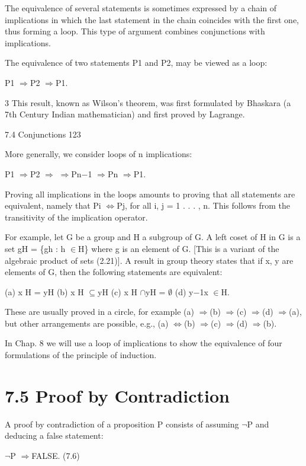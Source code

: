 \documentclass[11pt]{article}
\theoremstyle{plain}
\theoremstyle{definition}
\begin{document}
The equivalence of several statements is sometimes expressed by a chain of implications in which the last statement in the chain coincides with the first one, thus forming a loop. This type of argument combines conjunctions with implications.

The equivalence of two statements P1 and P2, may be viewed as a loop:

P1 $\Rightarrow$P2 $\Rightarrow$P1.

3 This result, known as Wilson's theorem, was first formulated by Bhaskara (a 7th Century Indian mathematician) and first proved by Lagrange.

7.4 Conjunctions 123

More generally, we consider loops of n implications:

P1 $\Rightarrow$P2 $\Rightarrow$\textperiodcentered{} \textperiodcentered{} \textperiodcentered{} $\Rightarrow$Pn$-$1 $\Rightarrow$Pn $\Rightarrow$P1.

Proving all implications in the loops amounts to proving that all statements are equivalent, namely that Pi $\Leftrightarrow$Pj, for all i, j = 1 . . . , n. This follows from the transitivity of the implication operator.

For example, let G be a group and H a subgroup of G. A left coset of H in G is a set gH = \{gh : h $\in$H\} where g is an element of G. [This is a variant of the algebraic product of sets (2.21)]. A result in group theory states that if x, y are elements of G, then the following statements are equivalent:

(a) x H = yH (b) x H $\subseteq$yH (c) x H $\cap$yH = $\emptyset$ (d) y$-$1x $\in$H.

These are usually proved in a circle, for example (a) $\Rightarrow$(b) $\Rightarrow$(c) $\Rightarrow$(d) $\Rightarrow$(a), but other arrangements are possible, e.g., (a) $\Leftrightarrow$(b) $\Rightarrow$(c) $\Rightarrow$(d) $\Rightarrow$(b).

In Chap. 8 we will use a loop of implications to show the equivalence of four formulations of the principle of induction.

\section{7.5 Proof by Contradiction}

A proof by contradiction of a proposition P consists of assuming $\neg$P and deducing a false statement:

$\neg$P $\Rightarrow$FALSE. (7.6)
\end{document}
